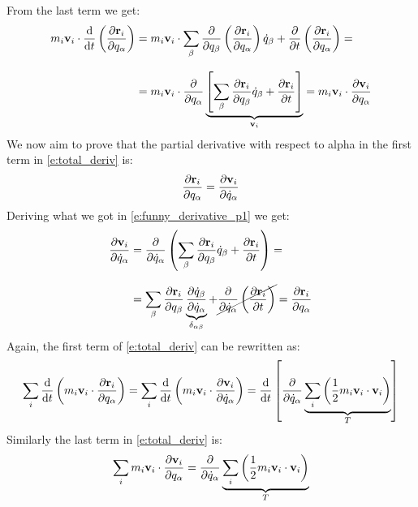 From the last term we get:
\begin{equation} \label{e:funny_derivative_p1}
    \begin{split}
      m_i\vec{v}_i \cdot \dv{}{t}\brackets{\pdv{ \vec{r}_i}{ q_{\alpha}}} &= m_i\vec{v}_i \cdot \bigsum_{\beta} \pdv{}{q_{\beta} }\brackets{\pdv{ \vec{r}_i}{ q_{\alpha}}} \dot{q}_{\beta} + \pdv{}{ t}\brackets{\pdv{ \vec{r}_i}{ q_{\alpha}}} = \\[8pt]
      &= m_i\vec{v}_i \cdot \pdv{}{ q_{\alpha} }\underbrace{\sqbr{\bigsum_{\beta} \pdv{ \vec{r}_i}{ q_{\beta}} \dot{q}_{\beta} + \pdv{ \vec{r}_i}{ t}}}_{\vec{v}_i} = m_i\vec{v}_i \cdot \pdv{ \vec{v}_i}{ q_{\alpha}}
    \end{split}
\end{equation}
We now aim to prove that the partial derivative with respect to alpha in the first term in \eqref{e:total_deriv} is:
\begin{equation}
    \pdv{ \vec{r}_i}{ q_{\alpha}} = \pdv{ \vec{v}_i}{ \dot{q}_{\alpha}}
\end{equation}
Deriving what we got in \eqref{e:funny_derivative_p1} we get:
\begin{equation}
    \begin{split}
      \pdv{ \vec{v}_i}{ \dot{q}_{\alpha}} &= \pdv{ }{ \dot{q}_{\alpha}} \brackets{\bigsum_{\beta}\pdv{ \vec{r}_i}{ q_{\beta}} \dot{q}_{\beta} + \pdv{ \vec{r}_i}{ t}} = \\[8pt]
      &= \bigsum_{\beta}\pdv{ \vec{r}_i}{ q_{\beta}} \underbrace{\pdv{ \dot{q}_{\beta}}{ \dot{q}_{\alpha}}}_{\delta_{\alpha \beta}}  + \cancel{\pdv{ }{ \dot{q}_{\alpha}}\brackets{\pdv{ \vec{r}_i}{ t}}} = \pdv{ \vec{r}_i}{ q_{\alpha}}
    \end{split}
\end{equation}
Again, the first term of \eqref{e:total_deriv} can be rewritten as:
\begin{equation}
    \bigsum_i \dv{}{t}\brackets{m_i\vec{v}_i \cdot \pdv{ \vec{r}_i}{ q_{\alpha}}} = \bigsum_i\dv{}{t}\brackets{m_i\vec{v}_i \cdot \pdv{ \vec{v}_i}{ \dot{q}_{\alpha}}} = \dv{}{t}\sqbr{\pdv{ }{ \dot{q}_{\alpha}} \underbrace{\bigsum_i \brackets{\dfrac{1}{2}m_i \vec{v}_i \cdot \vec{v}_i}}_{T}}
\end{equation}
Similarly the last term in \eqref{e:total_deriv} is:
\begin{equation}
    \bigsum_im_i\vec{v}_i \cdot \pdv{ \vec{v}_i}{ q_{\alpha}} = \pdv{ }{ \dot{q}_{\alpha}} \underbrace{\bigsum_i \brackets{\dfrac{1}{2}m_i \vec{v}_i \cdot \vec{v}_i}}_{T}
\end{equation}
